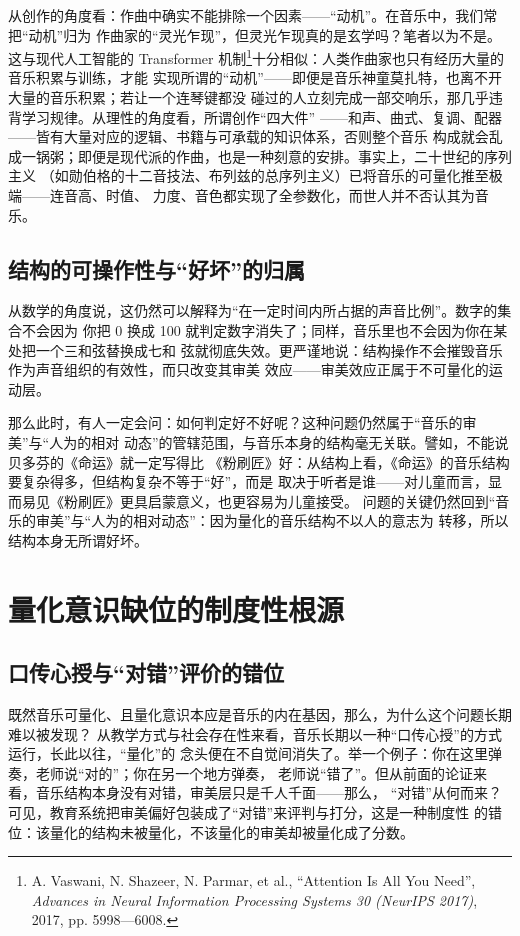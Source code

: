 \documentclass[11pt,a4paper,fontset=none]{ctexart}
\begin{document}
从创作的角度看：作曲中确实不能排除一个因素——“动机”。在音乐中，我们常把“动机”归为
作曲家的“灵光乍现”，但灵光乍现真的是玄学吗？笔者以为不是。这与现代人工智能的
Transformer 机制\footnote{A. Vaswani, N. Shazeer, N. Parmar, et al., “Attention Is All You Need”, \emph{Advances in Neural Information Processing Systems 30 (NeurIPS 2017)}, 2017, pp. 5998—6008.}十分相似：人类作曲家也只有经历大量的音乐积累与训练，才能
实现所谓的“动机”——即便是音乐神童莫扎特，也离不开大量的音乐积累；若让一个连琴键都没
碰过的人立刻完成一部交响乐，那几乎违背学习规律。从理性的角度看，所谓创作“四大件”
——和声、曲式、复调、配器——皆有大量对应的逻辑、书籍与可承载的知识体系，否则整个音乐
构成就会乱成一锅粥；即便是现代派的作曲，也是一种刻意的安排。事实上，二十世纪的序列主义
（如勋伯格的十二音技法、布列兹的总序列主义）已将音乐的可量化推至极端——连音高、时值、
力度、音色都实现了全参数化，而世人并不否认其为音乐。

\subsection{结构的可操作性与“好坏”的归属}

从数学的角度说，这仍然可以解释为“在一定时间内所占据的声音比例”。数字的集合不会因为
你把 0 换成 100 就判定数字消失了；同样，音乐里也不会因为你在某处把一个三和弦替换成七和
弦就彻底失效。更严谨地说：结构操作不会摧毁音乐作为声音组织的有效性，而只改变其审美
效应——审美效应正属于不可量化的运动层。

那么此时，有人一定会问：如何判定好不好呢？这种问题仍然属于“音乐的审美”与“人为的相对
动态”的管辖范围，与音乐本身的结构毫无关联。譬如，不能说贝多芬的《命运》就一定写得比
《粉刷匠》好：从结构上看，《命运》的音乐结构要复杂得多，但结构复杂不等于“好”，而是
取决于听者是谁——对儿童而言，显而易见《粉刷匠》更具启蒙意义，也更容易为儿童接受。
问题的关键仍然回到“音乐的审美”与“人为的相对动态”：因为量化的音乐结构不以人的意志为
转移，所以结构本身无所谓好坏。

\section{量化意识缺位的制度性根源}

\subsection{口传心授与“对错”评价的错位}

既然音乐可量化、且量化意识本应是音乐的内在基因，那么，为什么这个问题长期难以被发现？
从教学方式与社会存在性来看，音乐长期以一种“口传心授”的方式运行，长此以往，“量化”的
念头便在不自觉间消失了。举一个例子：你在这里弹奏，老师说“对的”；你在另一个地方弹奏，
老师说“错了”。但从前面的论证来看，音乐结构本身没有对错，审美层只是千人千面——那么，
“对错”从何而来？可见，教育系统把审美偏好包装成了“对错”来评判与打分，这是一种制度性
的错位：该量化的结构未被量化，不该量化的审美却被量化成了分数。
\end{document}
